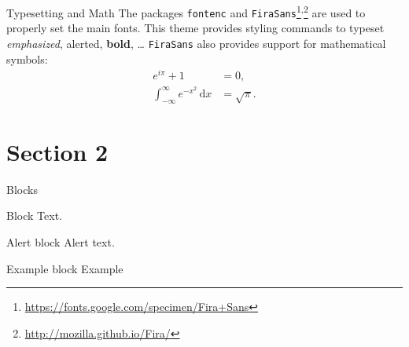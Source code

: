     \begin{frame}{Typesetting and Math}
        The packages \texttt{fontenc} and \texttt{FiraSans}\footnote{\url{https://fonts.google.com/specimen/Fira+Sans}}\textsuperscript{,}\footnote{\url{http://mozilla.github.io/Fira/}} are used to properly set the main fonts.
        \vfill
        This theme provides styling commands to typeset \emph{emphasized}, \alert{alerted}, \textbf{bold}, \dots
        \vfill
        \texttt{FiraSans} also provides support for mathematical symbols:
        \begin{align*}
            e^{i\pi} + 1 & = 0, \\
            \int_{-\infty}^\infty e^{-x^2}\,\mathrm{d}x & = \sqrt{\pi}.
        \end{align*}
    \end{frame}

    \section{Section 2}
    \begin{frame}{Blocks}
        \begin{block}{Block}
            Text.
        \end{block}
        \pause
        \begin{alertblock}{Alert block}
            Alert \alert{text}.
        \end{alertblock}
        \pause
        \begin{exampleblock}{Example block}
            Example
        \end{exampleblock}
    \end{frame}
    

